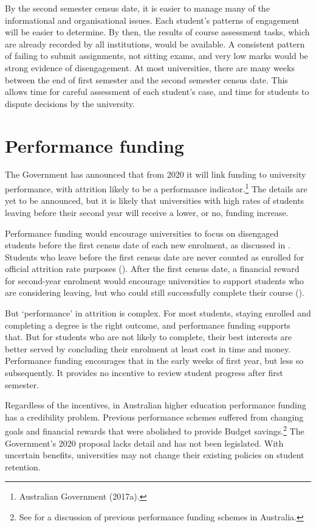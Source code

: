 By the second semester census date, it is easier to manage many of the informational and organisational issues. Each student's patterns of engagement will be easier to determine. By then, the results of course assessment tasks, which are already recorded by all institutions, would be available. A consistent pattern of failing to submit assignments, not sitting exams, and very low marks would be strong evidence of disengagement. At most universities, there are many weeks between the end of first semester and the second semester census date. This allows time for careful assessment of each student's case, and time for students to dispute decisions by the university.

\section{Performance funding}\label{sec:8.3}

The Government has announced that from 2020 it will link funding to university performance, with attrition likely to be a performance indicator.\footnote{Australian Government (2017a).} The details are yet to be announced, but it is likely that universities with high rates of students leaving before their second year will receive a lower, or no, funding increase.

Performance funding would encourage universities to focus on disengaged students before the first census date of each new enrolment, as discussed in . Students who leave before the first census date are never counted as enrolled for official attrition rate purposes (). After the first census date, a financial reward for second-year enrolment would encourage universities to support students who are considering leaving, but who could still successfully complete their course ().

But `performance' in attrition is complex. For most students, staying enrolled and completing a degree is the right outcome, and performance funding supports that. But for students who are not likely to complete, their best interests are better served by concluding their enrolment at least cost in time and money. Performance funding encourages that in the early weeks of first year, but less so subsequently. It provides no incentive to review student progress after first semester.

Regardless of the incentives, in Australian higher education performance funding has a credibility problem. Previous performance schemes suffered from changing goals and financial rewards that were abolished to provide Budget savings.\footnote{See \textcite[][chapter~5]{Coaldrake2016} for a discussion of previous performance funding schemes in Australia.} The Government's 2020 proposal lacks detail and has not been legislated. With uncertain benefits, universities may not change their existing policies on student retention.

